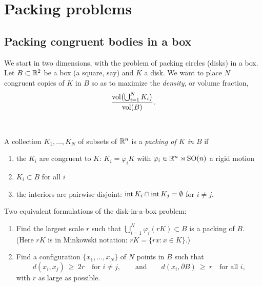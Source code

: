 \section{Packing problems}
\label{L1:sec:packing}

\subsection{Packing congruent bodies in a box}

We start in two dimensions, with the problem of packing circles (disks) in a box.
Let $B\subset\mathbb{R}^2$ be a box (a square, say) and $K$ a disk. We want to place $N$
congruent copies of $K$ in $B$ so as to maximize the \emph{density}, or volume fraction,
\[
  \frac{\operatorname{vol}\bigl(\bigcup_{i=1}^N K_i\bigr)}{\operatorname{vol}(B)} .
\]

\begin{center}
\\[2pt]
{\small {}}
\end{center}

\begin{definition}
\label{L1:def:packing-box}
A collection $K_1,\dots,K_N$ of subsets of $\mathbb{R}^n$ is a \emph{packing of $K$ in $B$} if
\begin{enumerate}[nosep]
  \item the $K_i$ are congruent to $K$: $K_i=\varphi_i K$ with
        $\varphi_i\in\mathbb{R}^n\rtimes\mathrm{SO}(n)$ a rigid motion\added{;}
  \item $K_i\subset B$ for all $i$\added{;}
  \item the interiors are pairwise disjoint: $\operatorname{int} K_i\cap\operatorname{int} K_j=\emptyset$
        for $i\neq j$.
\end{enumerate}
\end{definition}

\begin{example}
\label{L1:ex:radius}
Two equivalent formulations of the disk-in-a-box problem:
\begin{enumerate}[nosep]
  \item Find the largest scale $r$ such that $\bigcup_{i=1}^N \varphi_i(rK)\subset B$ is
        a packing of $B$. (Here $rK$ is in Minkowski notation:
        $rK=\{rx : x\in K\}$.)
  \item Find a configuration $\{x_1,\dots,x_N\}$ of $N$ points in $B$ such that
        \[
          d(x_i,x_j)\ \ge\ 2r \quad\text{for } i\ne j,
          \qquad\text{and}\qquad d(x_i,\partial B)\ \ge\ r \quad\text{for all } i,
        \]
        with $r$ as large as possible.
\end{enumerate}
\end{example}

